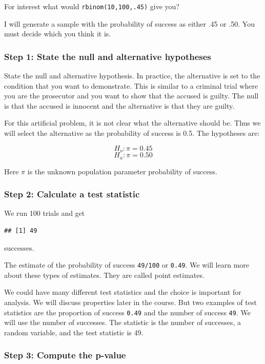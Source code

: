 \documentclass[]{book}
\theoremstyle{definition}
\theoremstyle{definition}
\theoremstyle{definition}
\theoremstyle{remark}
\begin{document}
For interest what would \texttt{rbinom(10,100,.45)} give you?

I will generate a sample with the probability of success as either .45
or .50. You must decide which you think it is.

\subsubsection{Step 1: State the null and alternative
hypotheses}\label{step-1-state-the-null-and-alternative-hypotheses}

State the null and alternative hypothesis. In practice, the alternative
is set to the condition that you want to demonstrate. This is similar to
a criminal trial where you are the prosecutor and you want to show that
the accused is guilty. The null is that the accused is innocent and the
alternative is that they are guilty.

For this artificial problem, it is not clear what the alternative should
be. Thus we will select the alternative as the probability of success is
0.5. The hypotheses are:

\[H_{o}: \pi = 0.45 \] \[H_{a}: \pi = 0.50 \]

Here \(\pi\) is the unknown population parameter probability of success.

\subsubsection{Step 2: Calculate a test
statistic}\label{step-2-calculate-a-test-statistic}

We run 100 trials and get

\begin{verbatim}
## [1] 49
\end{verbatim}

successes.

The estimate of the probability of success \texttt{49/100} or
\texttt{0.49}. We will learn more about these types of estimates. They
are called point estimates.

We could have many different test statistics and the choice is important
for analysis. We will discuss properties later in the course. But two
examples of test statistics are the proportion of success \texttt{0.49}
and the number of success \texttt{49}. We will use the number of
successes. The statistic is the number of successes, a random variable,
and the test statistic is 49.

\subsubsection{Step 3: Compute the
p-value}\label{step-3-compute-the-p-value}
\end{document}
